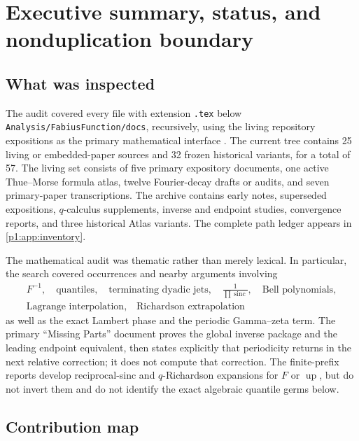 \documentclass[11pt,oneside]{article}
\numberwithin{equation}{section}
\theoremstyle{definition}
\theoremstyle{remark}
\newcommand{\Up}{\operatorname{up}}
\newcommand{\sinc}{\operatorname{sinc}}
\newcommand{\repo}{\nolinkurl{Analysis/FabiusFunction/docs}}
\begin{document}
\newpage

\section{Executive summary, status, and nonduplication boundary}
\label{p1:sec:executive}

\subsection{What was inspected}

The audit covered every file with extension \texttt{.tex} below \repo{}, recursively, using the living repository expositions as the primary mathematical interface \cite{p1:ProveItPrimary,p1:ProveItMissing,p1:ProveItAtlas,p1:ProveItFrontiers}.
The current tree contains 25 living or embedded-paper sources and 32 frozen historical
variants, for a total of 57.  The living set consists of five primary expository documents,
one active Thue--Morse formula atlas, twelve Fourier-decay drafts or audits, and seven
primary-paper transcriptions.  The archive contains early notes, superseded expositions,
$q$-calculus supplements, inverse and endpoint studies, convergence reports, and three
historical Atlas variants.  The complete path ledger appears in \cref{p1:app:inventory}.

The mathematical audit was thematic rather than merely lexical.  In particular, the search
covered occurrences and nearby arguments involving
\[
 \begin{gathered}
 F^{-1},\quad \text{quantiles},\quad \text{terminating dyadic jets},\quad
 \frac1{\prod\sinc},\quad \text{Bell polynomials},\\
 \text{Lagrange interpolation},\quad \text{Richardson extrapolation}
 \end{gathered}
\]
as well as the exact Lambert phase and the periodic Gamma--zeta term.  The primary
``Missing Parts'' document proves the global inverse package and the leading endpoint
equivalent, then states explicitly that periodicity returns in the next relative correction;
it does not compute that correction.  The finite-prefix reports develop reciprocal-sinc and
$q$-Richardson expansions for $F$ or $\Up$, but do not invert them and do not identify the
exact algebraic quantile germs below.

\subsection{Contribution map}
\end{document}
